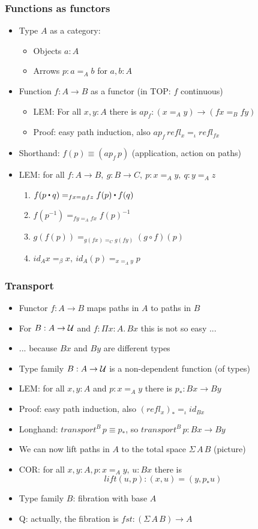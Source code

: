 \documentclass[handout]{beamer}
\newcommand{\depi}[3]{\Pi{#1{:}#2.\,#3}}
\newcommand{\UU}{{\cal U}}
\newcommand{\ct}{%
  \mathchoice{\mathbin{\raisebox{0.5ex}{$\displaystyle\centerdot$}}}%
             {\mathbin{\raisebox{0.5ex}{$\centerdot$}}}%
             {\mathbin{\raisebox{0.25ex}{$\scriptstyle\,\centerdot\,$}}}%
             {\mathbin{\raisebox{0.1ex}{$\scriptscriptstyle\,\centerdot\,$}}}
}
\newcommand{\opp}[1]{\mathord{{#1}^{-1}}}
\begin{document}
\frame
  {

    \frametitle{Functions as functors}

    \begin{itemize}[<+->]
    \item Type $A$ as a category:
      \begin{itemize}
      \item Objects $a:A$
      \item Arrows $p: a =_A b$ for $a,b:A$
      \end{itemize}
    \item Function $f:A\to B$ as a functor (in TOP: $f$ continuous)
      \begin{itemize}
      \item LEM: For all $x,y:A$ there is $ap_f: (x=_A y)\to(f x =_B f y)$
      \item Proof: easy path induction, also $ap_f\,refl_x =_\iota refl_{fx}$
      \end{itemize}
    \item Shorthand: $f(p)\equiv (ap_f\,p)$ (application, action on paths)
    \item LEM: for all $f:A\to B,~g:B\to C,~p:x=_A y,~q:y =_A z$
      \begin{enumerate}
      \item $f(p\ct q) =_{fx =_B fz} f(p)\ct f(q)$
      \item $f(\opp p) =_{fy =_A fx} \opp{f(p)}$
      \item $g(f(p)) =_{g(f x)=_C g(fy)} (g\circ f)(p)$
      \item $id_A x =_\beta x,~id_A(p) =_{x=_A y} p$
      \end{enumerate}

    \end{itemize}
  }

\frame
  {

    \frametitle{Transport}

    \begin{itemize}[<+->]
    \item Functor $f:A\to B$ maps paths in $A$ to paths in $B$
    \item For $B:A\to\UU$ and $f:\depi{x}{A}{Bx}$ this is not so easy ...
    \item ... because $Bx$ and $By$ are different types
    \item Type family $B: A\to\UU$ is a non-dependent function (of types)
    \item LEM: for all $x,y:A$ and $p:x=_A y$ there is $p_*: Bx\to By$
    \item Proof: easy path induction, also $(refl_x)_* =_\iota id_{Bx}$
    \item Longhand: $transport^B\,p \equiv p_*$, so $transport^B\,p: Bx \to By$
    \item We can now lift paths in $A$ to the total space $\Sigma\,A\,B$ (picture)
    \item COR: for all $x,y:A,p:x=_A y,\,u:Bx$ there is $$lift(u,p): (x,u) = (y,p_*u)$$
    \item Type family $B$: fibration with base $A$
    \item Q: actually, the fibration is $fst: (\Sigma\,A\,B) \to A$
    \end{itemize}
  }
\end{document}
